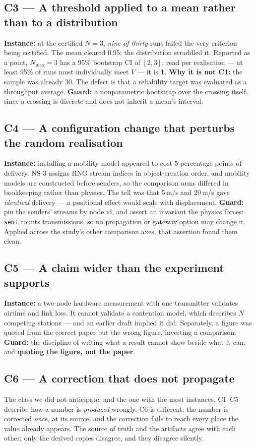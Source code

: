 \documentclass[conference]{IEEEtran}
\begin{document}
\subsection{C3 --- A threshold applied to a mean rather than to a distribution}
\textbf{Instance:} at the certified $N{=}3$, \emph{nine of thirty} runs failed the very criterion
being certified. The mean cleared $0.95$; the distribution straddled it. Reported as a point,
$N_{\max}{=}3$ has a 95\% bootstrap CI of $[2,3]$; read per realisation --- at least 95\% of runs
must individually meet $V$ --- it is \textbf{1}.
\textbf{Why it is not C1:} the sample was already 30. The defect is that a reliability target was
evaluated as a throughput average.
\textbf{Guard:} a nonparametric bootstrap over the crossing itself, since a crossing is discrete and
does not inherit a mean's interval.

\subsection{C4 --- A configuration change that perturbs the random realisation}
\textbf{Instance:} installing a mobility model appeared to cost 5 percentage points of delivery.
NS-3 assigns RNG stream indices in object-creation order, and mobility models are constructed before
senders, so the comparison arms differed in bookkeeping rather than physics. The tell was that
5\,m/s and 20\,m/s gave \emph{identical} delivery --- a positional effect would scale with
displacement.
\textbf{Guard:} pin the senders' streams by node id, and assert an invariant the physics forces:
\texttt{sent} counts transmissions, so no propagation or gateway option may change it. Applied
across the study's other comparison axes, that assertion found them clean.

\subsection{C5 --- A claim wider than the experiment supports}
\textbf{Instance:} a two-node hardware measurement with one transmitter validates airtime and link
loss. It cannot validate a contention model, which describes $N$ competing stations --- and an
earlier draft implied it did. Separately, a figure was quoted from the correct paper but the wrong
figure, inverting a comparison.
\textbf{Guard:} the discipline of writing what a result cannot show beside what it can, and
\textbf{quoting the figure, not the paper}.

\subsection{C6 --- A correction that does not propagate}
The class we did not anticipate, and the one with the most instances. C1--C5 describe how a number
is \emph{produced} wrongly. C6 is different: the number is corrected \emph{once}, at its source,
and the correction fails to reach every place the value already appears. The source of truth and the
artifacts agree with each other; only the derived copies disagree, and they disagree silently.
\end{document}
